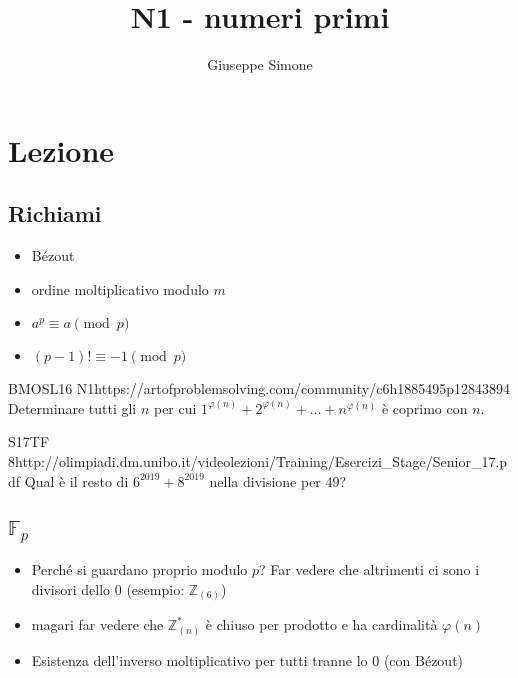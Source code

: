 \documentclass[12pt]{article}
\author{Giuseppe Simone}
\title{N1 - numeri primi}
\begin{document}
\maketitle


\section{Lezione}

\subsection{Richiami}
\begin{itemize}
	\item Bézout
	\item ordine moltiplicativo modulo $m$
	\item $a^p\equiv a\pmod p$
	\item $(p-1)!\equiv-1\pmod p$
\end{itemize}

\begin{esercizio}{BMOSL16 N1}{https://artofproblemsolving.com/community/c6h1885495p12843894}
    Determinare tutti gli $n$ per cui $1^{\varphi(n)}+2^{\varphi(n)}+\dots+n^{\varphi(n)}$ è coprimo con $n$.
\end{esercizio}

\begin{esercizio}{S17TF 8}{http://olimpiadi.dm.unibo.it/videolezioni/Training/Esercizi_Stage/Senior_17.pdf}
    Qual è il resto di $6^{2019}+8^{2019}$ nella divisione per $49$?
\end{esercizio}

\subsection{$\mathbb{F}_{p}$}
\begin{itemize}
	\item Perché si guardano proprio modulo $p$? Far vedere che altrimenti ci sono i divisori dello 0 (esempio: $\mathbb{Z}_{(6)}$)
	\item magari far vedere che $\mathbb{Z}_{(n)}^{*}$ è chiuso per prodotto e ha cardinalità $\varphi(n)$
	\item Esistenza dell'inverso moltiplicativo per tutti tranne lo 0 (con Bézout)
\end{itemize}
\end{document}
